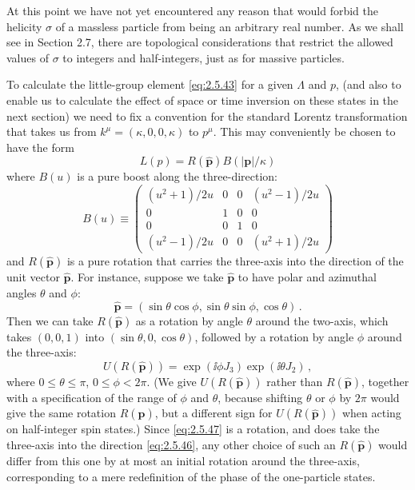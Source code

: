 At this point we have not yet encountered any reason that would forbid the
helicity $\sigma$ of a massless particle from being an arbitrary real number.
As we shall see in Section 2.7, there are topological considerations that
restrict the allowed values of $\sigma$ to integers and half-integers, just as
for massive particles.

To calculate the little-group element \eqref{eq:2.5.43} for a given $\Lambda$ and $p$,
(and also to enable us to calculate the effect of space or time inversion on
these states in the next section) we need to fix a convention for the standard
Lorentz transformation that takes us from
$k^\mu=(\kappa,0,0,\kappa)$ to $p^\mu$. This may conveniently be chosen to have
the form
\begin{equation}
L(p)=R(\hat{\mathbf{p}})B(|\mathbf{p}|/\kappa)
\tag{2.5.44}\label{eq:2.5.44}
\end{equation}
where $B(u)$ is a pure boost along the three-direction:
\begin{equation}
B(u)\equiv
\begin{pmatrix}
(u^2+1)/2u&0&0&(u^2-1)/2u\\
0&1&0&0\\
0&0&1&0\\
(u^2-1)/2u&0&0&(u^2+1)/2u
\end{pmatrix}
\tag{2.5.45}\label{eq:2.5.45}
\end{equation}
and $R(\hat{\mathbf{p}})$ is a pure rotation that carries the three-axis into
the direction of the unit vector $\hat{\mathbf{p}}$. For instance, suppose we
take $\hat{\mathbf{p}}$ to have polar and azimuthal angles $\theta$ and $\phi$:
\begin{equation}
\hat{\mathbf{p}}=(\sin\theta\cos\phi,\sin\theta\sin\phi,\cos\theta)\,.
\tag{2.5.46}\label{eq:2.5.46}
\end{equation}
Then we can take $R(\hat{\mathbf{p}})$ as a rotation by angle $\theta$ around
the two-axis, which takes $(0,0,1)$ into $(\sin\theta,0,\cos\theta)$, followed
by a rotation by angle $\phi$ around the three-axis:
\begin{equation}
U(R(\hat{\mathbf{p}}))=\exp(\ii\phi J_3)\exp(\ii\theta J_2)\,,
\tag{2.5.47}\label{eq:2.5.47}
\end{equation}
where $0\leq\theta\leq\pi$, $0\leq\phi<2\pi$. (We give
$U(R(\hat{\mathbf{p}}))$ rather than $R(\hat{\mathbf{p}})$, together with a
specification of the range of $\phi$ and $\theta$, because shifting $\theta$
or $\phi$ by $2\pi$ would give the same rotation $R(\hat{\mathbf{p}})$, but a
different sign for $U(R(\hat{\mathbf{p}}))$ when acting on half-integer spin
states.) Since \eqref{eq:2.5.47} is a rotation, and does take the three-axis into the
direction \eqref{eq:2.5.46}, any other choice of such an $R(\hat{\mathbf{p}})$ would
differ from this one by at most an initial rotation around the three-axis,
corresponding to a mere redefinition of the phase of the one-particle states.

